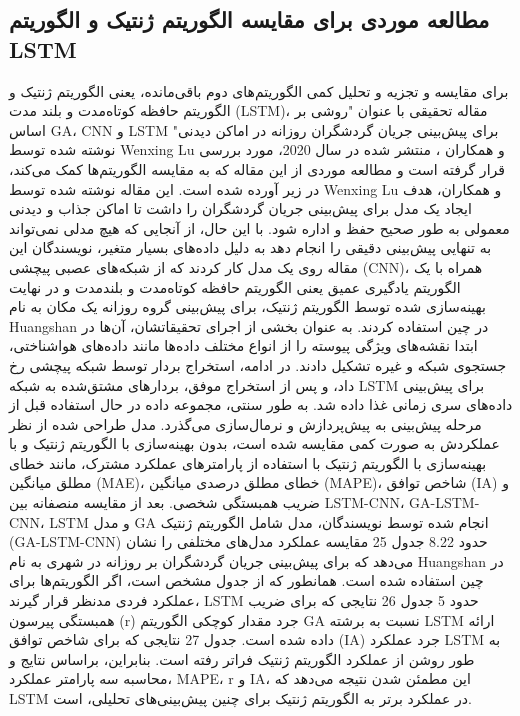 \documentclass{CSICC2020}
\begin{document}
\subsection{مطالعه موردی برای مقایسه الگوریتم ژنتیک و الگوریتم LSTM }
برای مقایسه و تجزیه و تحلیل کمی الگوریتم‌های دوم باقی‌مانده، یعنی الگوریتم ژنتیک و الگوریتم حافظه کوتاه‌مدت و بلند مدت (LSTM)، مقاله تحقیقی با عنوان "روشی بر اساس GA، CNN و LSTM برای پیش‌بینی جریان گردشگران روزانه در اماکن دیدنی" نوشته شده توسط Wenxing Lu و همکاران ، منتشر شده در سال 2020، مورد بررسی قرار گرفته است و مطالعه موردی از این مقاله که به مقایسه الگوریتم‌ها کمک می‌کند، در زیر آورده شده است. این مقاله نوشته شده توسط Wenxing Lu و همکاران، هدف ایجاد یک مدل برای پیش‌بینی جریان گردشگران را داشت تا اماکن جذاب و دیدنی معمولی به طور صحیح حفظ و اداره شود. با این حال، از آنجایی که هیچ مدلی نمی‌تواند به تنهایی پیش‌بینی دقیقی را انجام دهد به دلیل داده‌های بسیار متغیر، نویسندگان این مقاله روی یک مدل کار کردند که از شبکه‌های عصبی پیچشی (CNN)، همراه با یک الگوریتم یادگیری عمیق یعنی الگوریتم حافظه کوتاه‌مدت و بلندمدت و در نهایت بهینه‌سازی شده توسط الگوریتم ژنتیک، برای پیش‌بینی گروه روزانه یک مکان به نام Huangshan در چین استفاده کردند. به عنوان بخشی از اجرای تحقیقاتشان، آن‌ها در ابتدا نقشه‌های ویژگی پیوسته را از انواع مختلف داده‌ها مانند داده‌های هواشناختی، جستجوی شبکه و غیره تشکیل دادند. در ادامه، استخراج بردار توسط شبکه پیچشی رخ داد، و پس از استخراج موفق، بردارهای مشتق‌شده به شبکه LSTM برای پیش‌بینی داده‌های سری زمانی غذا داده شد. به طور سنتی، مجموعه داده در حال استفاده قبل از مرحله پیش‌بینی به پیش‌پردازش و نرمال‌سازی می‌گذرد. مدل طراحی شده از نظر عملکردش به صورت کمی مقایسه شده است، بدون بهینه‌سازی با الگوریتم ژنتیک و با بهینه‌سازی با الگوریتم ژنتیک با استفاده از پارامترهای عملکرد مشترک، مانند خطای مطلق میانگین (MAE)، خطای مطلق درصدی میانگین (MAPE)، شاخص توافق (IA) و ضریب همبستگی شخصی. بعد از مقایسه منصفانه بین LSTM-CNN، GA-LSTM-CNN، LSTM و مدل GA انجام شده توسط نویسندگان، مدل شامل الگوریتم ژنتیک (GA-LSTM-CNN) حدود 8.22%
جدول 25 مقایسه عملکرد مدل‌های مختلفی را نشان می‌دهد که برای پیش‌بینی جریان گردشگران بر روزانه در شهری به نام Huangshan در چین استفاده شده است. همانطور که از جدول مشخص است، اگر الگوریتم‌ها برای عملکرد فردی مدنظر قرار گیرند، LSTM حدود 5%
جدول 26 نتایجی که برای ضریب همبستگی پیرسون (r) جرد مقدار کوچکی الگوریتم GA نسبت به برشته LSTM ارائه داده شده است. 
جدول 27 نتایجی که برای شاخص توافق (IA) جرد عملکرد LSTM به طور روشن از عملکرد الگوریتم ژنتیک فراتر رفته است. بنابراین، براساس نتایج و محاسبه سه پارامتر عملکرد، MAPE، r و IA، این مطمئن شدن نتیجه می‌دهد که LSTM در عملکرد برتر به الگوریتم ژنتیک برای چنین پیش‌بینی‌های تحلیلی، است. 
\end{document}

